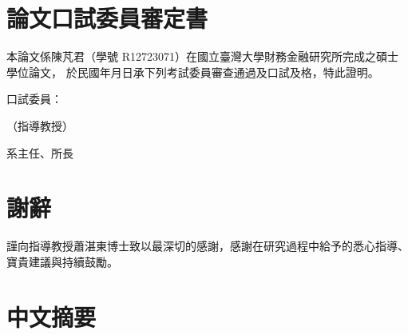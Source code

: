 \documentclass[12pt, a4paper, oneside]{ctexbook}
\begin{document}
\chapter*{論文口試委員審定書}
\thispagestyle{plain}

\vspace{1cm}
\noindent 本論文係陳芃君（學號 R12723071）在國立臺灣大學財務金融研究所完成之碩士學位論文，
於民國\underline{\hspace{2em}}年\underline{\hspace{2em}}月\underline{\hspace{2em}}日承下列考試委員審查通過及口試及格，特此證明。

\vspace{3cm}
\noindent 口試委員：

\vspace{1.5cm}
\hspace{4cm}\underline{\hspace{8cm}}（指導教授）

\vspace{1.2cm}
\hspace{4cm}\underline{\hspace{8cm}}

\vspace{1.2cm}
\hspace{4cm}\underline{\hspace{8cm}}

\vspace{1.2cm}
\hspace{4cm}\underline{\hspace{8cm}}

\vspace{2cm}
\noindent 系主任、所長\underline{\hspace{8cm}}

\chapter*{謝辭}
\thispagestyle{plain}

\noindent 謹向指導教授蕭湛東博士致以最深切的感謝，感謝在研究過程中給予的悉心指導、
寶貴建議與持續鼓勵。

\chapter*{中文摘要}
\thispagestyle{plain}
\end{document}
